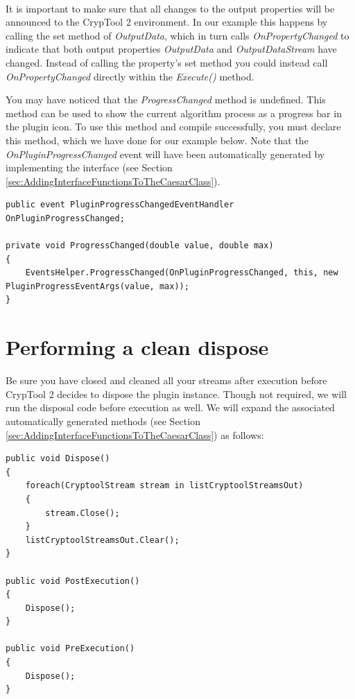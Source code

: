 \ \\
It is important to make sure that all changes to the output properties will be announced to the CrypTool 2 environment. In our example this happens by calling the set method of \textit{OutputData}, which in turn calls \textit{OnPropertyChanged} to indicate that both output properties \textit{OutputData} and \textit{OutputDataStream} have changed. Instead of calling the property's set method you could instead call \textit{OnPropertyChanged} directly within the \textit{Execute()} method.
\clearpage

You may have noticed that the \textit{ProgressChanged} method is undefined. This method can be used to show the current algorithm process as a progress bar in the plugin icon. To use this method and compile successfully, you must declare this method, which we have done for our example below. Note that the \textit{OnPluginProgressChanged} event will have been automatically generated by implementing the interface (see Section \ref{sec:AddingInterfaceFunctionsToTheCaesarClass}).

\begin{lstlisting}
public event PluginProgressChangedEventHandler OnPluginProgressChanged;

private void ProgressChanged(double value, double max)
{
	EventsHelper.ProgressChanged(OnPluginProgressChanged, this, new PluginProgressEventArgs(value, max));
}
\end{lstlisting}

\section{Performing a clean dispose}
\label{sec:PerformingACleanDispose}

Be sure you have closed and cleaned all your streams after execution before CrypTool 2 decides to dispose the plugin instance. Though not required, we will run the disposal code before execution as well. We will expand the associated automatically generated methods (see Section \ref{sec:AddingInterfaceFunctionsToTheCaesarClass}) as follows:

\begin{lstlisting}
public void Dispose()
{
	foreach(CryptoolStream stream in listCryptoolStreamsOut)
	{
		stream.Close();
	}
	listCryptoolStreamsOut.Clear();
}

public void PostExecution()
{
	Dispose();
}

public void PreExecution()
{
	Dispose();
}
\end{lstlisting}
\clearpage

